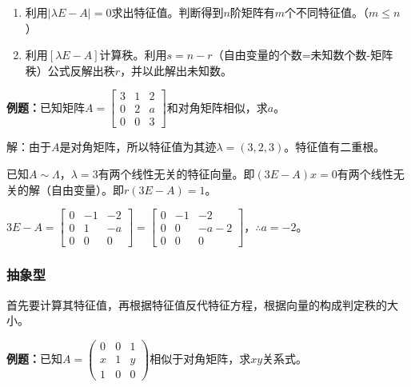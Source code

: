 
\begin{enumerate}
    \item 利用$\vert\lambda E-A\vert=0$求出特征值。判断得到$n$阶矩阵有$m$个不同特征值。（$m\leqslant n$）
    \item 利用$[\lambda E-A]$计算秩。利用$s=n-r$（自由变量的个数=未知数个数-矩阵秩）公式反解出秩$r$，并以此解出未知数。
\end{enumerate}

\textbf{例题：}已知矩阵$A=\left[\begin{array}{ccc}
    3 & 1 & 2 \\
    0 & 2 & a \\
    0 & 0 & 3
\end{array}\right]$和对角矩阵相似，求$a$。\medskip

解：由于$A$是对角矩阵，所以特征值为其迹$\lambda=(3,2,3)$。特征值有二重根。

已知$A\sim\Lambda$，$\lambda=3$有两个线性无关的特征向量。即$(3E-A)x=0$有两个线性无关的解（自由变量）。即$r(3E-A)=1$。

$3E-A=\left[\begin{array}{ccc}
    0 & -1 & -2 \\
    0 & 1 & -a \\
    0 & 0 & 0
\end{array}\right]=\left[\begin{array}{ccc}
    0 & -1 & -2 \\
    0 & 0 & -a-2 \\
    0 & 0 & 0
\end{array}\right]$，$\therefore a=-2$。

\subsubsection{抽象型}

首先要计算其特征值，再根据特征值反代特征方程，根据向量的构成判定秩的大小。

\textbf{例题：}已知$A=\left(\begin{array}{ccc}
    0 & 0 & 1 \\
    x & 1 & y \\
    1 & 0 & 0
\end{array}\right)$相似于对角矩阵，求$xy$关系式。

